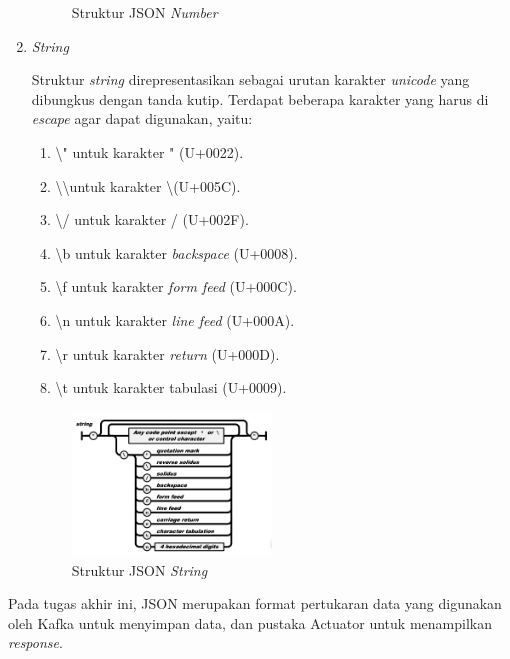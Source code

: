 \begin{enumerate}[listparindent=2.5em]
\begin{figure}[H]
		\caption{Struktur JSON \textit{Number}}
	\end{figure}
	\item \textit{String}
	\par Struktur \textit{string} direpresentasikan sebagai urutan karakter \textit{unicode} yang dibungkus dengan tanda kutip. Terdapat beberapa karakter yang harus di \textit{escape} agar dapat digunakan, yaitu:
	\begin{enumerate}
		\item \textbackslash " untuk karakter " (U+0022).
		\item \textbackslash\textbackslash\space untuk karakter \textbackslash\space (U+005C).
		\item \textbackslash / untuk karakter / (U+002F).
		\item \textbackslash b untuk karakter \textit{backspace} (U+0008).
		\item \textbackslash f untuk karakter \textit{form feed} (U+000C).
		\item \textbackslash n untuk karakter \textit{line feed} (U+000A).
		\item \textbackslash r untuk karakter \textit{return} (U+000D).
		\item \textbackslash t untuk karakter tabulasi (U+0009).
	\end{enumerate}
	\begin{figure}[H]
		\centering\includegraphics[width=0.5\textwidth]{bab2/img/json_string.jpg}
		\caption{Struktur JSON \textit{String}}
	\end{figure}
\end{enumerate}
\par Pada tugas akhir ini, JSON merupakan format pertukaran data yang digunakan oleh Kafka untuk menyimpan data, dan pustaka Actuator untuk menampilkan \textit{response}.

